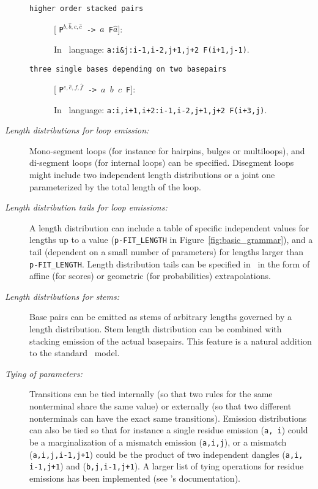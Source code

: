 \begin{description}
\begin{footnotesize}
\begin{description}
\item[\texttt{higher order stacked pairs}] [ \texttt{P$^{b,\hat
      b,c,\hat c}$ -> $a$ F$\hat a$}]:\, 

In \tornado\, language: \texttt{a:i\&j:i-1,i-2,j+1,j+2 F(i+1,j-1)}.

\item[\texttt{three single bases  depending on two basepairs}] [
  \texttt{P$^{e, \hat e, f, \hat f}$ -> $a$ $b$ $c$  F}]:\, 

In \tornado\, language: \texttt{a:i,i+1,i+2:i-1,i-2,j+1,j+2 F(i+3,j)}.

\end{description} 
\end{footnotesize}


\item[\textsl{Length distributions for loop emission:}] Mono-segment
  loops (for instance for hairpins, bulges or multiloops), and
  di-segment loops (for internal loops) can be specified. Disegment
  loops might include two independent length distributions or a joint
  one parameterized by the total length of the loop.

\item[\textsl{Length distribution tails for loop emissions:}] A length
  distribution can include a table of specific independent values for
  lengths up to a value (\texttt{p-FIT\_LENGTH} in
  Figure~\ref{fig:basic_grammar}), and a tail (dependent on a small
  number of parameters) for lengths larger than
  \texttt{p-FIT\_LENGTH}.  Length distribution tails can be specified
  in \tornado\, in the form of affine (for scores) or geometric (for
  probabilities) extrapolations.

\item[\textsl{Length distributions for stems:}] Base pairs can be
  emitted as stems of arbitrary lengths governed by a length
  distribution.  Stem length distribution can be combined with
  stacking emission of the actual basepairs. This feature is a natural
  addition to the standard \nn\, model.

\item[\textsl{Tying of parameters:}] Transitions can be tied
  internally (so that two rules for the same nonterminal share the
  same value) or externally (so that two different nonterminals can
  have the exact same transitions). Emission distributions can also be
  tied so that for instance a single residue emission (\texttt{a\sep
    i}) could be a marginalization of a mismatch emission
  (\texttt{a\sep i,j}), or a mismatch (\texttt{a\sep i,j\sep i-1,j+1})
  could be the product of two independent dangles (\texttt{a\sep i\sep
    i-1,j+1}) and (\texttt{b\sep j\sep i-1,j+1}). A larger list of
  tying operations for residue emissions has been implemented (see
  \tornado's documentation).


\end{description}

